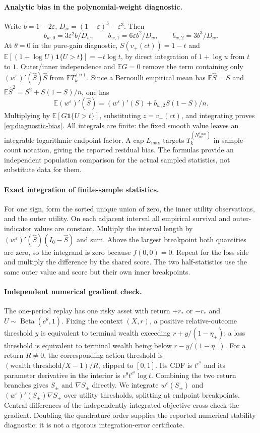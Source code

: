 \documentclass[11pt]{article}
\newcommand{\E}{\mathbb E}
\newcommand{\1}{\mathbf 1}
\newcommand{\eps}{\varepsilon}
\begin{document}
\paragraph{Analytic bias in the polynomial-weight diagnostic.}
Write $b=1-2\eps$, $D_w=(1-\eps)^3-\eps^3$. Then
\[
 b_{w,0}=3\eps^2b/D_w,\qquad b_{w,1}=6\eps b^2/D_w,
 \qquad b_{w,2}=3b^3/D_w.
\]
At $\theta=0$ in the pure-gain diagnostic, $S(v_+(ct))=1-t$ and
$\E[(1+\log U)\1\{U>t\}]=-t\log t$, by direct integration of $1+\log u$ from $t$ to $1$. Outer/inner independence and $\E G=0$ remove the term containing only $(w^\eps)'(\widehat S)\widehat S$ from $\E T_k^{(n)}$. Since a Bernoulli empirical mean has $\E\widehat S=S$ and $\E\widehat S^2=S^2+S(1-S)/n$, one has
\[
 \E (w^\eps)'(\widehat S)=(w^\eps)'(S)+b_{w,2}S(1-S)/n.
\]
Multiplying by $\E[G\1\{U>t\}]$, substituting $z=v_+(ct)$, and integrating proves \eqref{eq:diagnostic-bias}. All integrals are finite: the fixed smooth value leaves an integrable logarithmic endpoint factor. A cap $L_{\max}$ targets $T_k^{(N_02^{L_{\max}})}$ in sample-count notation, giving the reported residual bias. The formulas provide an independent population comparison for the actual sampled statistics, not substitute data for them.

\paragraph{Exact integration of finite-sample statistics.}
For one sign, form the sorted unique union of zero, the inner utility observations, and the outer utility. On each adjacent interval all empirical survival and outer-indicator values are constant. Multiply the interval length by $(w^\eps)'(\widehat S)(I_0-\widehat S)$ and sum. Above the largest breakpoint both quantities are zero, so the integrand is zero because $f(0,0)=0$. Repeat for the loss side and multiply the difference by the shared score. The two half-statistics use the same outer value and score but their own inner breakpoints.

\paragraph{Independent numerical gradient check.}
The one-period replay has one risky asset with return $+r_*$ or $-r_*$ and $U\sim\operatorname{Beta}(e^\theta,1)$. Fixing the context $(X,r)$, a positive relative-outcome threshold $y$ is equivalent to terminal wealth exceeding $r+y/(1-\eta_+)$; a loss threshold is equivalent to terminal wealth being below $r-y/(1-\eta_-)$. For a return $R\ne0$, the corresponding action threshold is $(\text{wealth threshold}/X-1)/R$, clipped to $[0,1]$. Its CDF is $t^{e^\theta}$ and its parameter derivative in the interior is $e^\theta t^{e^\theta}\log t$. Combining the two return branches gives $S_\pm$ and $\nabla S_\pm$ directly. We integrate $w^\eps(S_\pm)$ and $(w^\eps)'(S_\pm)\nabla S_\pm$ over utility thresholds, splitting at endpoint breakpoints. Central differences of the independently integrated objective cross-check the gradient. Doubling the quadrature order supplies the reported numerical stability diagnostic; it is not a rigorous integration-error certificate.
\end{document}
